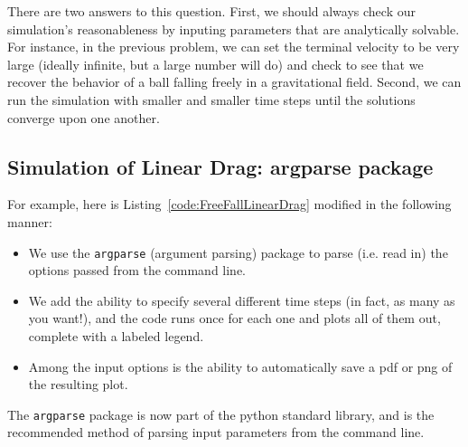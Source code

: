 There are two answers to this question. First, we should always check our simulation's reasonableness by inputing parameters that are analytically solvable. For instance, in the previous problem, we can set the terminal velocity to be very large (ideally infinite, but a large number will do) and check to see that we recover the behavior of a ball falling freely in a gravitational field. Second, we can run the simulation with smaller and smaller time steps until the solutions converge upon one another. 

\subsection{Simulation of Linear Drag: \textsf{argparse} package}
\label{sec-LinDragArgParse}


For example, here is Listing~\ref{code:FreeFallLinearDrag} modified in the following manner: 
\begin{itemize}
	\item We use the \texttt{argparse} (argument parsing) package to parse (i.e. read in) the options passed from the command line.
	\item We add the ability to specify several different time steps (in fact, as many as you want!), and the code runs once for each one and plots all of them out, complete with a labeled legend. 
	\item Among the input options is the ability to automatically save a pdf or png of the resulting plot.
\end{itemize}
The \texttt{argparse} package is now part of the python standard library, and is the recommended method of parsing input parameters from the command line. 


